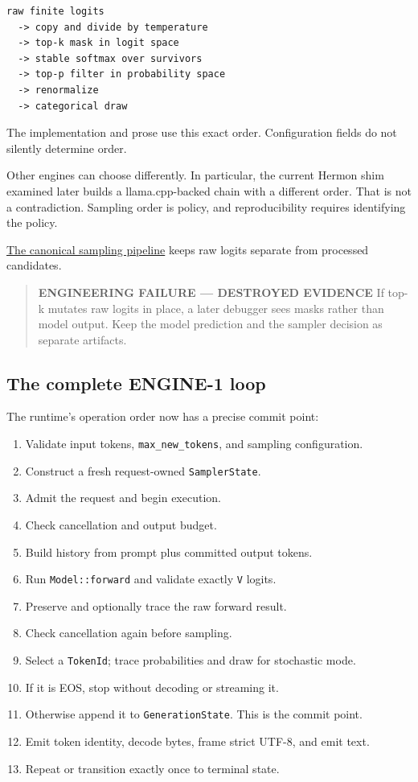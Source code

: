 \documentclass[
  10pt,
]{article}
\providecommand{\tightlist}{%
  \setlength{\itemsep}{0pt}\setlength{\parskip}{0pt}}
\begin{document}
\begin{verbatim}
raw finite logits
  -> copy and divide by temperature
  -> top-k mask in logit space
  -> stable softmax over survivors
  -> top-p filter in probability space
  -> renormalize
  -> categorical draw
\end{verbatim}

The implementation and prose use this exact order. Configuration fields
do not silently determine order.

Other engines can choose differently. In particular, the current Hermon
shim examined later builds a llama.cpp-backed chain with a different
order. That is not a contradiction. Sampling order is policy, and
reproducibility requires identifying the policy.

\href{https://github.com/hermonai/inside-the-llm-engine/blob/astra-visual-rewrite/diagrams/sampling/sampling-pipeline.txt}{The
canonical sampling pipeline} keeps raw logits separate from processed
candidates.

\begin{quote}
\textbf{ENGINEERING FAILURE --- DESTROYED EVIDENCE} If top-k mutates raw
logits in place, a later debugger sees masks rather than model output.
Keep the model prediction and the sampler decision as separate
artifacts.
\end{quote}

\subsection{The complete ENGINE-1
loop}\label{the-complete-engine-1-loop}

The runtime's operation order now has a precise commit point:

\begin{enumerate}
\def\labelenumi{\arabic{enumi}.}
\tightlist
\item
  Validate input tokens, \texttt{max\_new\_tokens}, and sampling
  configuration.
\item
  Construct a fresh request-owned \texttt{SamplerState}.
\item
  Admit the request and begin execution.
\item
  Check cancellation and output budget.
\item
  Build history from prompt plus committed output tokens.
\item
  Run \texttt{Model::forward} and validate exactly \texttt{V} logits.
\item
  Preserve and optionally trace the raw forward result.
\item
  Check cancellation again before sampling.
\item
  Select a \texttt{TokenId}; trace probabilities and draw for stochastic
  mode.
\item
  If it is EOS, stop without decoding or streaming it.
\item
  Otherwise append it to \texttt{GenerationState}. This is the commit
  point.
\item
  Emit token identity, decode bytes, frame strict UTF-8, and emit text.
\item
  Repeat or transition exactly once to terminal state.
\end{enumerate}
\end{document}
